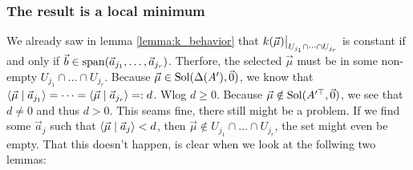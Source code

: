 \subsubsection{The result is a local minimum}
We already saw in lemma \ref{lemma:k_behavior} that $\restrict{k(\vec\mu)}{U_{j_1} \cap \dots \cap U_{j_r}}$ is constant if and only if $\vec b \in \operatorname{span}(\vec a_{j_1}, \dots, \vec a_{j_r})$. Therfore, the selected $\vec\mu$ must be in some non-empty $U_{j_1} \cap \dots \cap U_{j_r}$. Because $\vec\mu \in \operatorname{Sol}(\Delta(A'), \vec0)$, we know that $\langle \vec\mu \mid \vec a_{j_1} \rangle = \dots = \langle \vec\mu \mid \vec a_{j_r} \rangle =: d$. Wlog $d \geq 0$. Because $\vec\mu \notin \operatorname{Sol}(A'^\top, \vec0)$, we see that $d \neq 0$ and thus $d > 0$. This seams fine, there still might be a problem. If we find some $\vec a_j$ such that $\langle \vec\mu \mid \vec a_j \rangle < d$, then $\vec\mu \notin U_{j_1} \cap \dots \cap U_{j_r}$, the set might even be empty. That this doesn't happen, is clear when we look at the follwing two lemmas:

